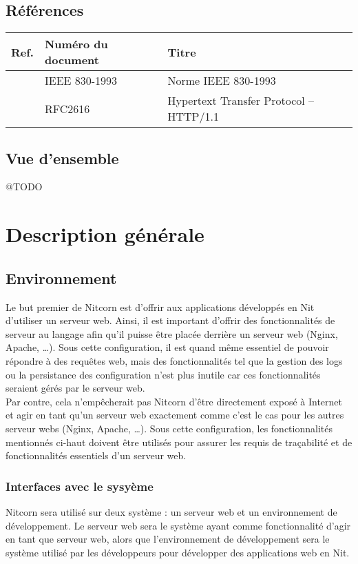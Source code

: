 \documentclass{scrreprt}
\begin{document}
\section{Références}
\begin{tabularx}{\textwidth}{|l|X|l|}
    \hline
    Ref. & Numéro du document & Titre \\
    \hline
    \cite{ieefr} & IEEE 830-1993 & Norme IEEE 830-1993 \\
    \hline
    \cite{http} & RFC2616 & Hypertext Transfer Protocol -- HTTP/1.1 \\
    \hline
\end{tabularx}

\section{Vue d'ensemble}
@TODO
\chapter{Description générale}
\section{Environnement}
Le but premier de Nitcorn est d'offrir aux applications développés en Nit
d'utiliser
un serveur web. Ainsi, il est important d'offrir des fonctionnalités de serveur
au langage afin qu'il puisse être placée derrière un serveur web (Nginx, Apache,
\ldots).
Sous cette configuration, il est quand même essentiel de pouvoir répondre à des
requêtes web, mais des fonctionnalités tel que la gestion des logs ou la
persistance
des configuration n'est plus inutile car ces fonctionnalités seraient gérés par
le serveur web.\\
Par contre, cela n'empêcherait pas Nitcorn d'être directement exposé à Internet
et agir en tant qu'un serveur web exactement comme c'est le cas pour les autres
serveur webs (Nginx, Apache, \ldots). Sous cette configuration, les
fonctionnalités
mentionnés ci-haut doivent être utilisés pour assurer les requis de traçabilité
et de fonctionnalités essentiels d'un serveur web.

\subsection{Interfaces avec le sysyème}
Nitcorn sera utilisé sur deux système : un serveur web et un environnement de développement.
Le serveur web sera le système ayant comme fonctionnalité d'agir en tant que serveur web, alors
que l'environnement de développement sera le système utilisé par les développeurs
pour développer des applications web en Nit.
\end{document}
